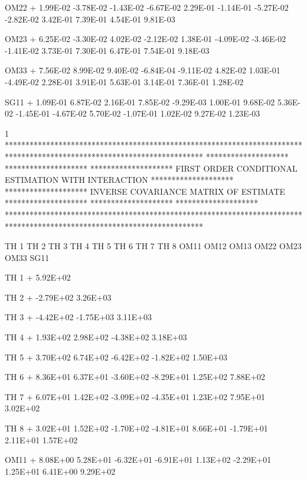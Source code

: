 \documentclass[
  letterpaper,
  toc=chapterentrywithdots,
  listof=totoc,
  11pt,
  headings=small,
  usegeometry]{scrreprt}
\begin{document}
\begin{nonmemlisting}
 OM22
+        1.99E-02 -3.78E-02 -1.43E-02 -6.67E-02  2.29E-01 -1.14E-01 -5.27E-02 -2.82E-02  3.42E-01  7.39E-01  4.54E-01  9.81E-03
 
 OM23
+        6.25E-02 -3.30E-02  4.02E-02 -2.12E-02  1.38E-01 -4.09E-02 -3.46E-02 -1.41E-02  3.73E-01  7.30E-01  6.47E-01  7.54E-01
          9.18E-03
 
 OM33
+        7.56E-02  8.99E-02  9.40E-02 -6.84E-04 -9.11E-02  4.82E-02  1.03E-01 -4.49E-02  2.28E-01  3.91E-01  5.63E-01  3.14E-01
          7.36E-01  1.28E-02
 
 SG11
+        1.09E-01  6.87E-02  2.16E-01  7.85E-02 -9.29E-03  1.00E-01  9.68E-02  5.36E-02 -1.45E-01 -4.67E-02  5.70E-02 -1.07E-01
          1.02E-02  9.27E-02  1.23E-03
 
1
 ************************************************************************************************************************
 ********************                                                                                ********************
 ********************               FIRST ORDER CONDITIONAL ESTIMATION WITH INTERACTION              ********************
 ********************                      INVERSE COVARIANCE MATRIX OF ESTIMATE                     ********************
 ********************                                                                                ********************
 ************************************************************************************************************************
 

            TH 1      TH 2      TH 3      TH 4      TH 5      TH 6      TH 7      TH 8      OM11      OM12      OM13      OM22  
             OM23      OM33      SG11  
 
 TH 1
+        5.92E+02
 
 TH 2
+       -2.79E+02  3.26E+03
 
 TH 3
+       -4.42E+02 -1.75E+03  3.11E+03
 
 TH 4
+        1.93E+02  2.98E+02 -4.38E+02  3.18E+03
 
 TH 5
+        3.70E+02  6.74E+02 -6.42E+02 -1.82E+02  1.50E+03
 
 TH 6
+        8.36E+01  6.37E+01 -3.60E+02 -8.29E+01  1.25E+02  7.88E+02
 
 TH 7
+        6.07E+01  1.42E+02 -3.09E+02 -4.35E+01  1.23E+02  7.95E+01  3.02E+02
 
 TH 8
+        3.02E+01  1.52E+02 -1.70E+02 -4.81E+01  8.66E+01 -1.79E+01  2.11E+01  1.57E+02
 
 OM11
+        8.08E+00  5.28E+01 -6.32E+01 -6.91E+01  1.13E+02 -2.29E+01  1.25E+01  6.41E+00  9.29E+02
 

\end{nonmemlisting}
\end{document}
